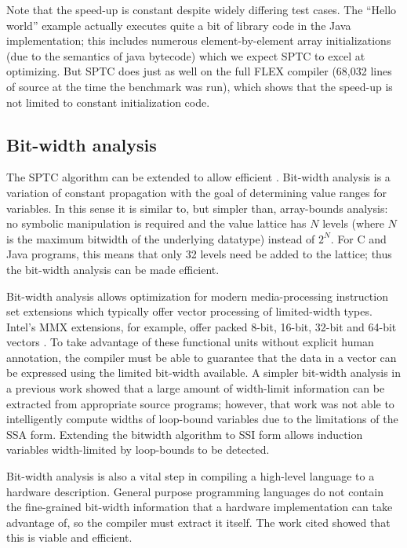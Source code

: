 \documentclass[12pt,titlepage,twoside]{article}
\begin{document}
Note that the speed-up is constant despite widely differing test
cases.  The ``Hello world'' example actually executes quite a bit of
library code in the Java implementation; this includes numerous
element-by-element array initializations (due to the semantics of
java bytecode) which we expect SPTC to excel at optimizing.  But SPTC
does just as well on the full FLEX compiler (68,032 lines of source
at the time the benchmark was run), which shows that the speed-up is
not limited to constant initialization code.

\subsection{Bit-width analysis}\label{sec:bitwidth}
The SPTC algorithm can be extended to allow efficient
.  Bit-width analysis is a variation of
constant propagation with the goal of determining value ranges for
variables.  In this sense it is similar to, but simpler than,
array-bounds analysis: no symbolic manipulation is required and the
value lattice has $N$ levels (where $N$ is the maximum bitwidth of the
underlying datatype) instead of $2^N$.  For C and Java programs, this
means that only 32 levels need be added to the lattice; thus the
bit-width analysis can be made efficient.

Bit-width analysis allows optimization for modern media-processing
instruction set extensions which typically offer vector processing of
limited-width types. Intel's MMX extensions, for example, offer packed
8-bit, 16-bit, 32-bit and 64-bit vectors \cite{peleg97:mmx}.
To take advantage of these functional units without explicit human
annotation, the compiler must be able to guarantee that the data in a
vector can be expressed using the limited bit-width available.  A
simpler bit-width analysis in a previous work \cite{ananian:siliconc}
showed that a large amount of width-limit information can be extracted
from appropriate source programs; however, that work was not able to
intelligently compute widths of loop-bound variables due to the
limitations of the SSA form.  Extending the bitwidth algorithm to SSI
form allows induction variables width-limited by loop-bounds to be
detected.

Bit-width analysis is also a vital step in compiling a high-level
language to a hardware description.  General purpose programming
languages do not contain the fine-grained bit-width information that a
hardware implementation can take advantage of, so the compiler must
extract it itself.  The work cited showed that this is viable
and efficient.
\end{document}
